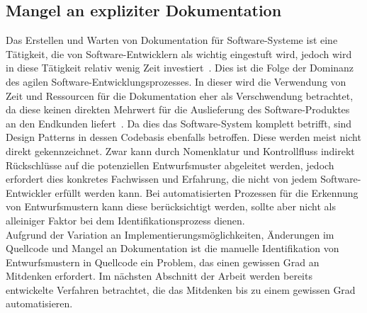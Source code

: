 \subsection*{Mangel an expliziter Dokumentation}

Das Erstellen und Warten von Dokumentation für Software-Systeme ist eine Tätigkeit, die von Software-Entwicklern als wichtig eingestuft wird, jedoch wird in diese Tätigkeit relativ wenig Zeit investiert~\cite[S, 162]{zhi2015cost}.
Dies ist die Folge der Dominanz des agilen Software-Entwicklungsprozesses. In dieser wird die Verwendung von Zeit und Ressourcen für die Dokumentation eher als Verschwendung betrachtet, da diese keinen direkten Mehrwert für die Auslieferung des Software-Produktes an den Endkunden liefert~\cite[S. 159]{zhi2015cost}.
Da dies das Software-System komplett betrifft, sind Design Patterns in dessen Codebasis ebenfalls betroffen. Diese werden meist nicht direkt gekennzeichnet. 
Zwar kann durch Nomenklatur und Kontrollfluss indirekt Rückschlüsse auf die potenziellen Entwurfsmuster abgeleitet werden, jedoch erfordert dies konkretes Fachwissen und Erfahrung, die nicht von jedem Software-Entwickler erfüllt werden kann.
Bei automatisierten Prozessen für die Erkennung von Entwurfsmustern kann diese berücksichtigt werden, sollte aber nicht als alleiniger Faktor bei dem Identifikationsprozess dienen.
\\

Aufgrund der Variation an Implementierungsmöglichkeiten, Änderungen im Quellcode und Mangel an Dokumentation ist die manuelle Identifikation von Entwurfsmustern in Quellcode ein Problem, das einen gewissen Grad an Mitdenken erfordert. Im nächsten Abschnitt der Arbeit werden bereits entwickelte Verfahren betrachtet, die das Mitdenken bis zu einem gewissen Grad automatisieren.




